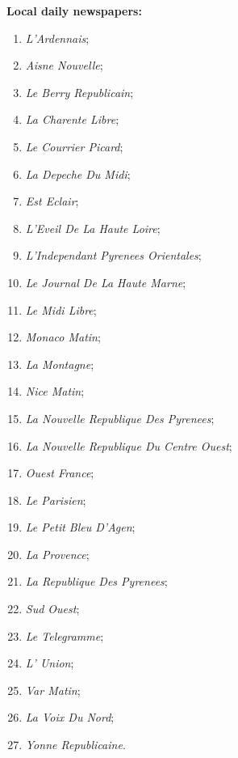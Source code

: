 \begin{multicols}{2}
\textbf{Local daily newspapers:}
	\begin{enumerate}
	\item \textit{L'Ardennais};
	\item  \textit{Aisne Nouvelle};
	\item \textit{Le Berry Republicain};
	\item \textit{La Charente Libre};
	\item \textit{Le Courrier Picard};
	\item \textit{La Depeche Du Midi};
	\item \textit{Est Eclair};
	\item \textit{L'Eveil De La Haute Loire};
	\item \textit{L'Independant Pyrenees Orientales};
	\item \textit{Le Journal De La Haute Marne};
	\item \textit{Le Midi Libre};
	\item \textit{Monaco Matin};
	\item \textit{La Montagne};
	\item \textit{Nice Matin};
	\item \textit{La Nouvelle Republique Des Pyrenees};
	\item \textit{La Nouvelle Republique Du Centre Ouest};
	\item \textit{Ouest France};
	\item \textit{Le Parisien};
	\item \textit{Le Petit Bleu D'Agen};
	\item \textit{La Provence};
	\item \textit{La Republique Des Pyrenees};
	\item \textit{Sud Ouest};
	\item \textit{Le Telegramme};
	\item \textit{L' Union};
	\item \textit{Var Matin};
	\item \textit{La Voix Du Nord};
	\item \textit{Yonne Republicaine}.
	\end{enumerate}
\end{multicols} 	

